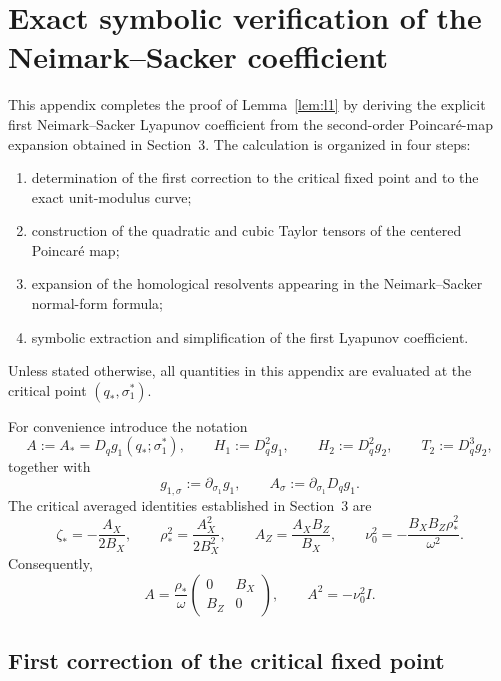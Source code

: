 \documentclass[11pt]{amsart}
\theoremstyle{remark}
\begin{document}
\section{Exact symbolic verification of the Neimark--Sacker coefficient}

This appendix completes the proof of Lemma~\ref{lem:l1} by deriving the
explicit first Neimark--Sacker Lyapunov coefficient from the second-order
Poincar\'e-map expansion obtained in Section~3.  The calculation is organized
in four steps:
\begin{enumerate}[label=\textup{(\arabic*)},leftmargin=2em]
\item determination of the first correction to the critical fixed point and
to the exact unit-modulus curve;
\item construction of the quadratic and cubic Taylor tensors of the centered
Poincar\'e map;
\item expansion of the homological resolvents appearing in the
Neimark--Sacker normal-form formula;
\item symbolic extraction and simplification of the first Lyapunov
coefficient.
\end{enumerate}
Unless stated otherwise, all quantities in this appendix are evaluated at
the critical point \((q_*,\sigma_1^*)\).

For convenience introduce the notation
\[
 A:=A_*=D_qg_1(q_*;\sigma_1^*),\qquad
 H_1:=D_q^2g_1,\qquad H_2:=D_q^2g_2,\qquad T_2:=D_q^3g_2,
\]
together with
\[
 g_{1,\sigma}:=\partial_{\sigma_1}g_1,\qquad
 A_\sigma:=\partial_{\sigma_1}D_qg_1.
\]
The critical averaged identities established in Section~3 are
\begin{equation}\label{eq:appendix-critical-identities}
\zeta_*=-\frac{A_X}{2B_X},\qquad
\rho_*^2=\frac{A_X^2}{2B_X^2},\qquad
A_Z=\frac{A_XB_Z}{B_X},\qquad
\nu_0^2=-\frac{B_XB_Z\rho_*^2}{\omega^2}.
\end{equation}
Consequently,
\[
 A=\frac{\rho_*}{\omega}
\begin{pmatrix}0&B_X\\B_Z&0\end{pmatrix},
\qquad
A^2=-\nu_0^2I.
\]

\subsection{First correction of the critical fixed point}
\end{document}
